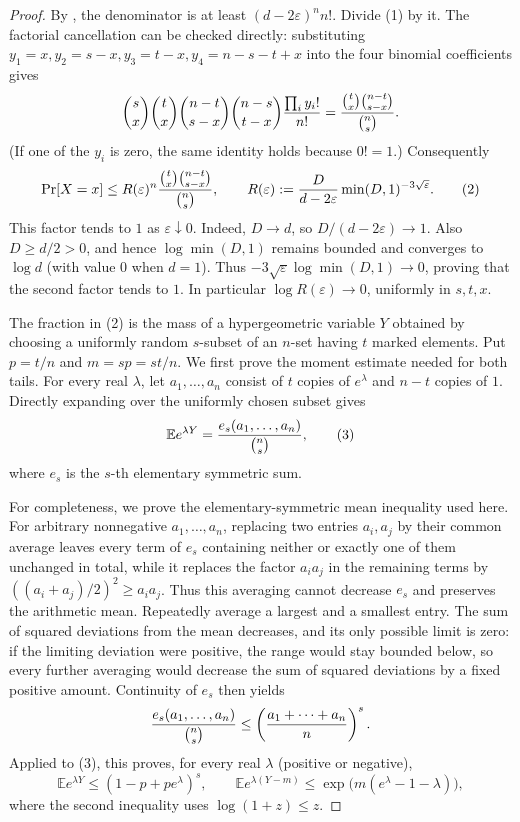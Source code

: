 \begin{proof}
By , the denominator is at least
$(d-2\varepsilon)^n n!$.  Divide (1) by it.  The factorial cancellation can
be checked directly: substituting
$y_1=x,y_2=s-x,y_3=t-x,y_4=n-s-t+x$ into the four binomial coefficients gives
\[
 {s\choose x}{t\choose x}{n-t\choose s-x}{n-s\choose t-x}
 {\prod_i y_i!\over n!}
 ={{t\choose x}{n-t\choose s-x}\over {n\choose s}}.
\]
(If one of the $y_i$ is zero, the same identity holds because $0!=1$.)
Consequently
\[
 \Pr[X=x]\le R(\varepsilon)^n
 { {t\choose x}{n-t\choose s-x}\over {n\choose s}},
 \qquad
 R(\varepsilon):={D\over d-2\varepsilon}
                  \min(D,1)^{-3\sqrt\varepsilon}.                 \tag{2}
\]
This factor tends to $1$ as $\varepsilon\downarrow0$.  Indeed,
$D\to d$, so $D/(d-2\varepsilon)\to1$.  Also $D\ge d/2>0$, and hence
$\log\min(D,1)$ remains bounded and converges to $\log d$ (with value $0$
when $d=1$).  Thus
$-3\sqrt\varepsilon\log\min(D,1)\to0$, proving that the second factor tends
to $1$.  In particular $\log R(\varepsilon)\to0$, uniformly in $s,t,x$.

The fraction in (2) is the mass of a hypergeometric variable $Y$ obtained by
choosing a uniformly random $s$-subset of an $n$-set having $t$ marked
elements.  Put $p=t/n$ and $m=sp=st/n$.  We first prove the moment estimate
needed for both tails.  For every real $\lambda$, let $a_1,\ldots,a_n$ consist
of $t$ copies of $e^\lambda$ and $n-t$ copies of $1$.  Directly expanding over
the uniformly chosen subset gives
\[
 \mathbb E e^{\lambda Y}
 ={e_s(a_1,\ldots,a_n)\over {n\choose s}},                         \tag{3}
\]
where $e_s$ is the $s$-th elementary symmetric sum.

For completeness, we prove the elementary-symmetric mean inequality used
here.  For arbitrary nonnegative $a_1,\ldots,a_n$, replacing two entries
$a_i,a_j$ by their common average leaves every term of $e_s$ containing
neither or exactly one of them unchanged in total, while it replaces the
factor $a_i a_j$ in the remaining terms by
$((a_i+a_j)/2)^2\ge a_i a_j$.  Thus this averaging cannot decrease $e_s$ and
preserves the arithmetic mean.  Repeatedly average a largest and a smallest
entry.  The sum of squared deviations from the mean decreases, and its only
possible limit is zero: if the limiting deviation were positive, the range
would stay bounded below, so every further averaging would decrease the sum
of squared deviations by a fixed positive amount.  Continuity of $e_s$ then yields
\[
 {e_s(a_1,\ldots,a_n)\over {n\choose s}}
 \le \left({a_1+\cdots+a_n\over n}\right)^s.
\]
Applied to (3), this proves, for every real $\lambda$ (positive or negative),
\[
 \mathbb E e^{\lambda Y}\le(1-p+pe^\lambda)^s,
 \qquad
 \mathbb E e^{\lambda(Y-m)}
 \le \exp\bigl(m(e^\lambda-1-\lambda)\bigr),                      \tag{4}
\]
where the second inequality uses $\log(1+z)\le z$.


\end{proof}
